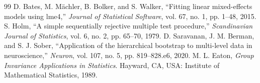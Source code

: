 \documentclass[11pt,a4paper]{article}
\begin{document}
\begin{thebibliography}{99}
 D. Bates, M. M\"achler, B. Bolker, and S. Walker, ``Fitting linear mixed-effects models using lme4,'' \emph{Journal of Statistical Software}, vol. 67, no. 1, pp. 1--48, 2015.
 S. Holm, ``A simple sequentially rejective multiple test procedure,'' \emph{Scandinavian Journal of Statistics}, vol. 6, no. 2, pp. 65--70, 1979.
 D. Saravanan, J. M. Berman, and S. J. Sober, ``Application of the hierarchical bootstrap to multi-level data in neuroscience,'' \emph{Neuron}, vol. 107, no. 5, pp. 819--828.e6, 2020.
 M. L. Eaton, \emph{Group Invariance Applications in Statistics}. Hayward, CA, USA: Institute of Mathematical Statistics, 1989.
\end{thebibliography}
\end{document}
